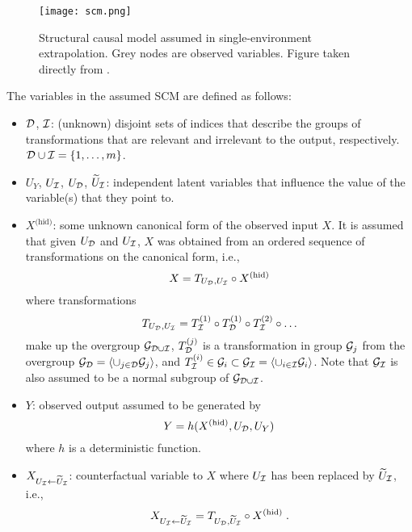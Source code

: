 \begin{figure}[H]
\centering
\texttt{[image: scm.png]}
\caption{Structural causal model assumed in single-environment extrapolation. Grey nodes are observed variables. Figure taken directly from \parencite{Mouli:2021}.}
\label{fig:scm}
\end{figure}

The variables in the assumed SCM are defined as follows:
\begin{itemize}

\item
$\mathcal{D}$, $\mathcal{I}$: (unknown) disjoint sets of indices that describe the groups of transformations that are relevant and irrelevant to the output, respectively. $\mathcal{D}\cup\mathcal{I}=\{1,\ldots,m\}$.

\item
$U_Y$, $U_{\mathcal{I}}$, $U_{\mathcal{D}}$, $\widetilde{U}_{\mathcal{I}}$: independent latent variables that influence the value of the variable(s) that they point to.

\item
$X^{\text{(hid)}}$: some unknown canonical form of the observed input $X$.  It is assumed that given $U_{\mathcal{D}}$ and $U_{\mathcal{I}}$, $X$ was obtained from an ordered sequence of transformations on the canonical form, i.e.,
\[
X=T_{U_{\mathcal{D}},U_{\mathcal{I}}}\circ X^{\text{(hid)}}
\]
where transformations
\[
T_{U_{\mathcal{D}},U_{\mathcal{I}}}=T_{\mathcal{I}}^{(1)}\circ T_{\mathcal{D}}^{(1)}\circ T_{\mathcal{I}}^{(2)}\circ\ldots
\]
make up the overgroup $\mathcal{G}_{\mathcal{D}\cup\mathcal{I}}$, $T_{\mathcal{D}}^{(j)}$ is a transformation in group $\mathcal{G}_j$ from the overgroup $\mathcal{G}_{\mathcal{D}}=\langle\cup_{j\in\mathcal{D}}\mathcal{G}_j\rangle$, and $T_{\mathcal{I}}^{(i)}\in\mathcal{G}_i\subset\mathcal{G}_{\mathcal{I}}=\langle\cup_{i\in\mathcal{I}}\mathcal{G}_i\rangle$. Note that $\mathcal{G}_{\mathcal{I}}$ is also assumed to be a normal subgroup of $\mathcal{G}_{\mathcal{D}\cup\mathcal{I}}$.

\item
$Y$: observed output assumed to be generated by
\[
Y = h(X^{\text{(hid)}},U_{\mathcal{D}},U_Y)
\]
where $h$ is a deterministic function.

\item
$X_{U_{\mathcal{I}}\leftarrow\widetilde{U}_{\mathcal{I}}}$: counterfactual variable to $X$ where $U_{\mathcal{I}}$ has been replaced by $\widetilde{U}_{\mathcal{I}}$, i.e.,
\[
X_{U_{\mathcal{I}}\leftarrow\widetilde{U}_{\mathcal{I}}} = T_{U_{\mathcal{D}},\widetilde{U}_{\mathcal{I}}}\circ X^{\text{(hid)}} \;.
\]

\end{itemize}

